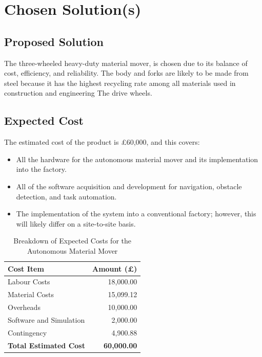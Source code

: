 \documentclass[12pt]{article}
\begin{document}
\section{Chosen Solution(s)}

\subsection{Proposed Solution}
The three-wheeled heavy-duty material mover, is chosen due to its balance of cost, efficiency, and reliability. 
The body and forks are likely to be made from steel because it has the highest recycling rate among all materials used in construction and engineering  \cite{baker2023}
The drive wheels.  

\subsection{Expected Cost}



{The estimated cost of the product \cite{P. Hinz} is £60,000, and this covers:}
\begin{itemize}
    \item All the hardware for the autonomous material mover and its implementation into the factory.
    \item All of the software acquisition and development for navigation, obstacle detection, and task automation.
    \item The implementation of the system into a conventional factory; however, this will likely differ on a site-to-site basis.
\end{itemize}


\begin{table}[h!]
    \centering
    \begin{tabular}{|l|r|}
        \hline
        \textbf{Cost Item}          & \textbf{Amount (£)} \\ \hline
        Labour Costs                 & 18,000.00           \\ \hline
        Material Costs              & 15,099.12           \\ \hline
        Overheads                   & 10,000.00           \\ \hline
        Software and Simulation     & 2,000.00            \\ \hline
        Contingency                 & 4,900.88            \\ \hline
        \textbf{Total Estimated Cost} & \textbf{60,000.00}  \\ \hline
    \end{tabular}
    \caption{Breakdown of Expected Costs for the Autonomous Material Mover}
    \label{tab:expected_costs}
\end{table}
\FloatBarrier
\end{document}
